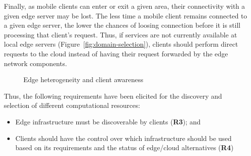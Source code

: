 Finally, as mobile clients can enter or exit a given area, their connectivity with a given edge server may be lost. The less time a mobile client remains connected to a given edge server, the lower the chances of loosing connection before it is still processing that client's request. Thus, if services are not currently available at local edge servers (Figure~\ref{fig:domain-selection}), clients should perform direct requests to the cloud instead of having their request forwarded by the edge network components. 

\begin{figure}[htbp]
	\centering
	\captionsetup[subfigure]{width=0.5\textwidth}	
	\null\hfill
	\captionsetup[subfigure]{width=0.45\textwidth}	
	\hfill
	\hfill\null
	\caption{Edge heterogeneity and client awareness}\label{fig:1}
\end{figure}

Thus, the following requirements have been elicited for the discovery and selection of different computational resources:

\begin{itemize}

	\item Edge infrastructure must be discoverable by clients (\textbf{R3}); and

	\item Clients should have the control over which infrastructure should be used based on its requirements and the status of edge/cloud alternatives (\textbf{R4})

\end{itemize}

